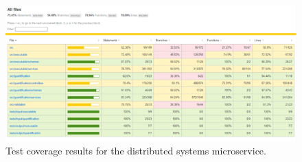 \begin{landscape}
\begin{figure}
    \centering
    \includegraphics[width=1.3\textwidth]{4_proposed_solution/web_app/figures/test_coverage.png}
    \caption{Test coverage results for the distributed systems microservice.}
    \label{fig:test_coverage}
\end{figure}
\end{landscape}
